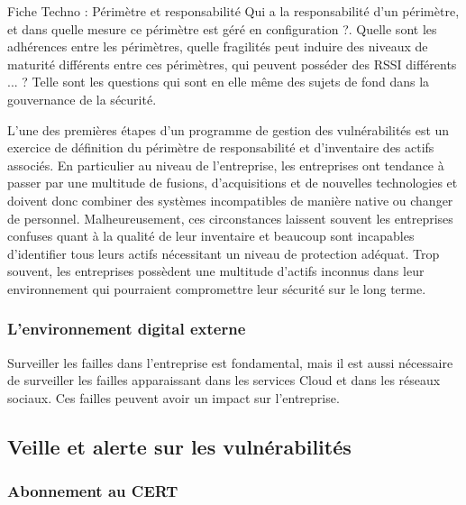 \begin{warningbox}{Fiche Techno : Périmètre et responsabilité}
Qui a la responsabilité d'un périmètre, et dans quelle mesure ce périmètre est géré en configuration ?. Quelle sont les adhérences entre les périmètres, quelle fragilités peut induire des niveaux de maturité différents entre ces périmètres, qui peuvent posséder des RSSI différents ... ? Telle sont les questions qui sont en elle même des sujets de fond dans la gouvernance de la sécurité.
\end{warningbox}


L'une des premières étapes d'un programme de gestion des vulnérabilités est un exercice de définition du périmètre de responsabilité et d'inventaire des actifs associés. En particulier au niveau de l'entreprise, les entreprises ont tendance à passer par une multitude de fusions, d'acquisitions et de nouvelles technologies et doivent donc combiner des systèmes incompatibles de manière native ou changer de personnel. Malheureusement, ces circonstances laissent souvent les entreprises confuses quant à la qualité de leur inventaire et beaucoup sont incapables d'identifier tous leurs actifs nécessitant un niveau de protection adéquat. Trop souvent, les entreprises possèdent une multitude d'actifs inconnus dans leur environnement qui pourraient compromettre leur sécurité sur le long terme.

\subsubsection{L’environnement digital externe}


Surveiller les failles dans l'entreprise est fondamental, mais il est aussi nécessaire de surveiller les failles apparaissant dans les services Cloud et dans les réseaux sociaux. Ces failles peuvent avoir un impact sur l'entreprise.

\subsection{Veille et alerte sur les vulnérabilités}

\subsubsection{Abonnement au CERT}

